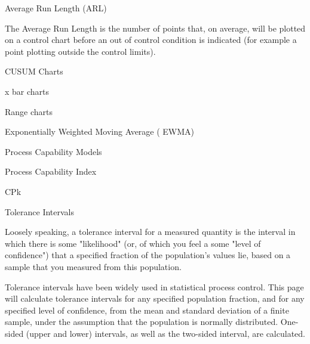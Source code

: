 
Average Run Length (ARL)

The Average Run Length is the number of points that, on average, will be plotted on a control chart before an out of control condition is indicated (for example a point plotting outside the control limits).



CUSUM Charts

x bar charts

Range charts

Exponentially Weighted Moving Average ( EWMA)


Process Capability Models

Process Capability Index

CPk 


Tolerance Intervals 

Loosely speaking, a tolerance interval for a measured quantity is the interval in which there is some "likelihood" (or, of which you feel a some "level of confidence") that a specified fraction of the population's values lie, based on a sample that you measured from this population.


Tolerance intervals have been widely used in statistical process control. This page will calculate tolerance intervals for any specified population fraction, and for any specified level of confidence, from the mean and standard deviation of a finite sample, under the assumption that the population is normally distributed. One-sided (upper and lower) intervals, as well as the two-sided interval, are calculated.




